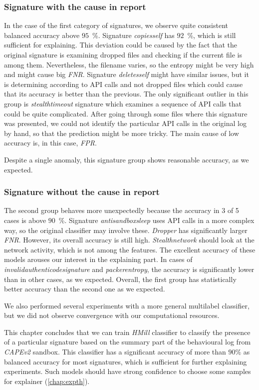 \subsubsection*{Signature with the cause in report}
In the case of the first category of signatures, we observe quite consistent balanced accuracy above $95$~\%. Signature \emph{copiesself} has $92$~\%, which is still sufficient for explaining. This deviation could be caused by the fact that the original signature is examining dropped files and checking if the current file is among them. Nevertheless, the filename varies, so the entropy might be very high and might cause big \emph{FNR}. Signature \emph{deletesself} might have similar issues, but it is determining according to API calls and not dropped files which could cause that its accuracy is better than the previous. The only significant outlier in this group is \emph{stealthtimeout} signature which examines a sequence of API calls that could be quite complicated. After going through some files where this signature was presented, we could not identify the particular API calls in the original log by hand, so that the prediction might be more tricky. The main cause of low accuracy is, in this case, \emph{FPR}.

Despite a single anomaly, this signature group shows reasonable accuracy, as we expected.

\subsubsection*{Signature without the cause in report}
The second group behaves more unexpectedly because the accuracy in 3 of 5 cases is above $90$~\%. Signature \emph{antisandboxsleep} uses API calls in a more complex way, so the original classifier may involve these. \emph{Dropper} has significantly larger \emph{FNR}. However, its overall accuracy is still high. \emph{Stealthnetwork} should look at the network activity, which is not among the features. The excellent accuracy of these models arouses our interest in the explaining part. In cases of \emph{invalidauthenticodesignature} and \emph{packerentropy}, the accuracy is significantly lower than in other cases, as we expected. Overall, the first group has statistically better accuracy than the second one as we expected.

We also performed several experiments with a more general multilabel classifier, but we did not observe convergence with our computational resources.

This chapter concludes that we can train \emph{HMill} classifier to classify the presence of a particular signature based on the summary part of the behavioural log from \emph{CAPEv2} sandbox. This classifier has a significant accuracy of more than $90\%$ as balanced accuracy for most signatures, which is sufficient for further explaining experiments. Such models should have strong confidence to choose some samples for explainer (\ref{chap:expth}). 


